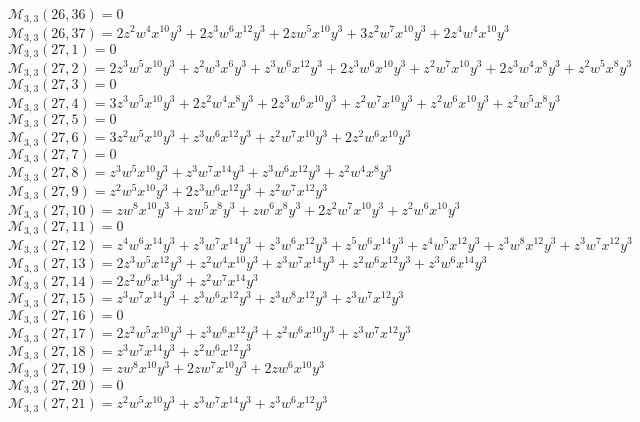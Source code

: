 \documentclass[12pt]{memoireuqam1.3}
\begin{document}
$\mathcal{M}_{3,3}(26,36)=0$\\
$\mathcal{M}_{3,3}(26,37)=2z^2w^4x^{10}y^3+2z^3w^6x^{12}y^3+2zw^5x^{10}y^3+3z^2w^7x^{10}y^3+2z^4w^4x^{10}y^3$\\
$\mathcal{M}_{3,3}(27,1)=0$\\
$\mathcal{M}_{3,3}(27,2)=2z^3w^5x^{10}y^3+z^2w^3x^6y^3+z^3w^6x^{12}y^3+2z^3w^6x^{10}y^3+z^2w^7x^{10}y^3+2z^3w^4x^8y^3+z^2w^5x^8y^3$\\
$\mathcal{M}_{3,3}(27,3)=0$\\
$\mathcal{M}_{3,3}(27,4)=3z^3w^5x^{10}y^3+2z^2w^4x^8y^3+2z^3w^6x^{10}y^3+z^2w^7x^{10}y^3+z^2w^6x^{10}y^3+z^2w^5x^8y^3$\\
$\mathcal{M}_{3,3}(27,5)=0$\\
$\mathcal{M}_{3,3}(27,6)=3z^2w^5x^{10}y^3+z^3w^6x^{12}y^3+z^2w^7x^{10}y^3+2z^2w^6x^{10}y^3$\\
$\mathcal{M}_{3,3}(27,7)=0$\\
$\mathcal{M}_{3,3}(27,8)=z^3w^5x^{10}y^3+z^3w^7x^{14}y^3+z^3w^6x^{12}y^3+z^2w^4x^8y^3$\\
$\mathcal{M}_{3,3}(27,9)=z^2w^5x^{10}y^3+2z^3w^6x^{12}y^3+z^2w^7x^{12}y^3$\\
$\mathcal{M}_{3,3}(27,10)=zw^8x^{10}y^3+zw^5x^8y^3+zw^6x^8y^3+2z^2w^7x^{10}y^3+z^2w^6x^{10}y^3$\\
$\mathcal{M}_{3,3}(27,11)=0$\\
$\mathcal{M}_{3,3}(27,12)=z^4w^6x^{14}y^3+z^3w^7x^{14}y^3+z^3w^6x^{12}y^3+z^5w^6x^{14}y^3+z^4w^5x^{12}y^3+z^3w^8x^{12}y^3+z^3w^7x^{12}y^3$\\
$\mathcal{M}_{3,3}(27,13)=2z^3w^5x^{12}y^3+z^2w^4x^{10}y^3+z^3w^7x^{14}y^3+z^2w^6x^{12}y^3+z^3w^6x^{14}y^3$\\
$\mathcal{M}_{3,3}(27,14)=2z^2w^6x^{14}y^3+z^2w^7x^{14}y^3$\\
$\mathcal{M}_{3,3}(27,15)=z^3w^7x^{14}y^3+z^3w^6x^{12}y^3+z^3w^8x^{12}y^3+z^3w^7x^{12}y^3$\\
$\mathcal{M}_{3,3}(27,16)=0$\\
$\mathcal{M}_{3,3}(27,17)=2z^2w^5x^{10}y^3+z^3w^6x^{12}y^3+z^2w^6x^{10}y^3+z^3w^7x^{12}y^3$\\
$\mathcal{M}_{3,3}(27,18)=z^3w^7x^{14}y^3+z^2w^6x^{12}y^3$\\
$\mathcal{M}_{3,3}(27,19)=zw^8x^{10}y^3+2zw^7x^{10}y^3+2zw^6x^{10}y^3$\\
$\mathcal{M}_{3,3}(27,20)=0$\\
$\mathcal{M}_{3,3}(27,21)=z^2w^5x^{10}y^3+z^3w^7x^{14}y^3+z^3w^6x^{12}y^3$\\
\end{document}
